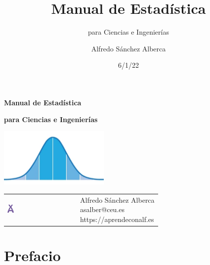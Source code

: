 \documentclass[
  a4paper,
]{scrreport}
\title{Manual de Estadística}
\subtitle{para Ciencias e Ingenierías}
\author{Alfredo Sánchez Alberca}
\date{6/1/22}
\renewcommand*\contentsname{Indice de contenidos}
\newcommand\contentsname{Indice de contenidos}
\theoremstyle{definition}
\theoremstyle{definition}
\theoremstyle{plain}
\theoremstyle{remark}
\begin{document}
\begin{titlepage}

\begin{center}
\vspace*{5cm}

\Huge
{\textbf{\textsf{Manual de Estadística}}}

\vspace{0.5cm}
\LARGE
{\textbf{\textsf{para Ciencias e Ingenierías}}}

\vspace{1.5cm}

\includegraphics[width=0.4\textwidth]{img/logos/gauss-bell.png}
\end{center}

\vfill

\begin{flushleft}
\begin{tabular}{ll}
\includegraphics[width=0.1\textwidth]{img/logos/aprendeconalf.png} & \parbox[b]{5cm}{\Large\textsf{Alfredo
Sánchez
Alberca}\\ \textsf{asalber@ceu.es} \\ \textsf{https://aprendeconalf.es}}
\end{tabular}
\end{flushleft}
\end{titlepage}\ifdefined\Shaded\renewenvironment{Shaded}{\begin{tcolorbox}[breakable, interior hidden, enhanced, borderline west={3pt}{0pt}{shadecolor}, sharp corners, boxrule=0pt, frame hidden]}{\end{tcolorbox}}\fi

\renewcommand*\contentsname{Indice de contenidos}
{
\hypersetup{linkcolor=}
\setcounter{tocdepth}{2}
\tableofcontents
}

\hypertarget{prefacio}{%
\chapter*{Prefacio}\label{prefacio}}
\end{document}
